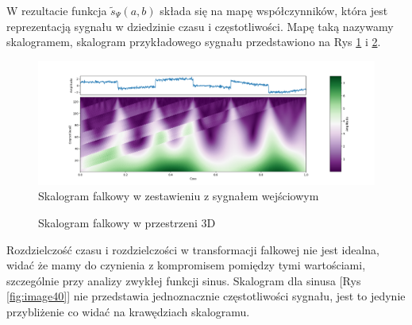 W rezultacie funkcja $ \tilde{s}_{\Psi}\left(a,b\right)$ składa się na mapę współczynników, która jest reprezentacją sygnału w dziedzinie czasu i częstotliwości. Mapę taką nazywamy skalogramem, skalogram przykładowego sygnału przedstawiono na Rys \ref{fig:image38} i \ref{fig:image39}.

\begin{figure}[ht]
    \centering
    \begin{minipage}[t]{0.9\linewidth}
        \includegraphics[width=\linewidth]{Rozdziały/02.Podstawy_teoretyczne/Obrazy/skalogram.png}
        \caption{Skalogram falkowy w zestawieniu z sygnałem wejściowym}
        \label{fig:image38}
    \end{minipage}
\end{figure}

\begin{figure}[ht]
    \centering
    \caption{Skalogram falkowy w przestrzeni 3D}
    \label{fig:image39}
\end{figure}
\newpage
Rozdzielczość czasu i rozdzielczości w transformacji falkowej nie jest idealna, widać że mamy do czynienia z kompromisem pomiędzy tymi wartościami, szczególnie przy analizy zwykłej funkcji sinus. Skalogram dla sinusa [Rys \ref{fig:image40}] nie przedstawia jednoznacznie częstotliwości sygnału, jest to jedynie przybliżenie co widać na krawędziach skalogramu.


